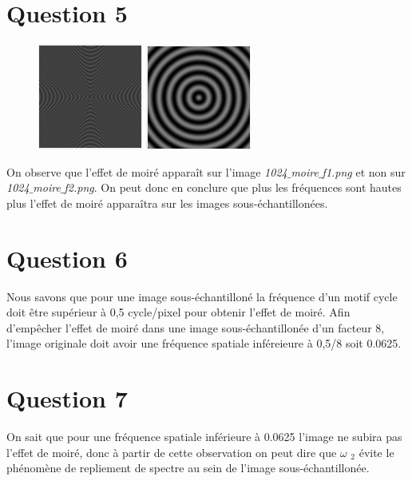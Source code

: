 \documentclass[a4paper,12pt]{report}
\begin{document}
\section*{Question 5}


\begin{figure}[!ht]
	\center	
		\includegraphics[scale=1]{image/q5_f1.png}	
		\includegraphics[scale=1]{image/q5_f2.png}	
\end{figure}

On observe que l'effet de moiré apparaît sur l'image \textit{1024$\_$moire$\_$f1.png} et non sur \textit{1024$\_$moire$\_$f2.png}. On peut donc en conclure que plus les fréquences sont hautes plus l'effet de moiré apparaîtra sur les images sous-échantillonées.

\section*{Question 6}

Nous savons que pour une image sous-échantilloné la fréquence d'un motif cycle doit être supérieur à 0,5 cycle/pixel pour obtenir l'effet de moiré. Afin d'empêcher l'effet de moiré dans une image sous-échantillonée d'un facteur 8, l'image originale doit avoir une fréquence spatiale inféreieure à 0,5/8 soit 0.0625.

\section*{Question 7}

On sait que pour une fréquence spatiale inférieure à 0.0625 l'image ne subira pas l'effet de moiré, donc à partir de cette observation on peut dire que $\omega$ $_{2}$ évite le phénomène de repliement de spectre au sein de l'image sous-échantillonée.
\end{document}
